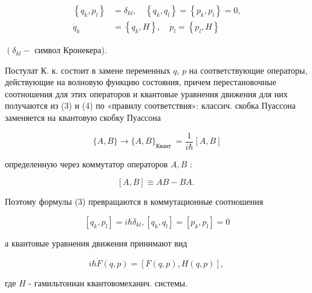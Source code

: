 \documentclass[10pt]{article}
\begin{document}
\[

\begin{aligned}

\left\{q_{k}, p_{l}\right\} & =\delta_{k l}, \quad\left\{q_{k}, q_{l}\right\}=\left\{p_{k}, p_{l}\right\}=0, \\

\dot{q}_{k} & =\left\{q_{k}, H\right\}, \quad \dot{p}_{l}=\left\{p_{l}, H\right\}

\end{aligned}

\]



$\left(\delta_{k l}-\right.$ символ Кронекера).



Постулат К. к. состоит в замене переменных $q$, $p$ на соответствующие операторы, действующие на волновую функцию состояния, причем перестановочные соотношения для этих операторов и квантовые уравнения движения для них получаются из (3) и (4) по «правилу соответствия»: классич. скобка Пуассона заменяется на квантовую скобку Пуассона



\[

\{A, B\} \rightarrow\{A, B\}_{\text {Квант }}=\frac{1}{i \hbar}[A, B]

\]



определенную через коммутатор операторов $A, B$ :



\[

[A, B] \equiv A B-B A \text {. }

\]



Поэтому формулы (3) превращаются в коммутационные соотношения



\[

\left[q_{k}, p_{l}\right]=i \hbar \delta_{k l},\left[q_{k}, q_{l}\right]=\left[p_{k}, p_{l}\right]=0

\]



а квантовые уравнения движения принимают вид



\[

i \hbar \dot{F}(q, p)=[F(q, p), H(q, p)] \text {, }

\]



где $H$ - гамильтониан квантовомеханич. системы.
\end{document}
